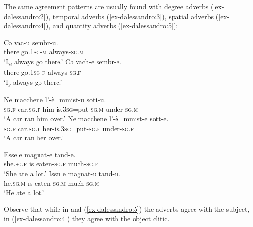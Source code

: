 \documentclass[output=paper
,modfonts
,nonflat]{langsci/langscibook}
\begin{document}
The same agreement patterns are usually found with degree adverbs (\ref{ex-dalessandro:2}), temporal adverbs (\ref{ex-dalessandro:3}), spatial adverbs (\ref{ex-dalessandro:4}), and quantity adverbs (\ref{ex-dalessandro:5}):
\begin{exe}
	\ex \label{ex-dalessandro:2} \citet{Ledgeway2012} 
	\endxlist
\end{exe}
\begin{exe}
	\ex \label{ex-dalessandro:3}
	\xlist
	\ex \label{ex-dalessandro:3a}
	\gll  Cə   vac-u    sembr-u.\\
	there  go.1\textsc{sg-m} always-\textsc{sg.m}\\
	\glt `I\textsc{\textsubscript{m}} always go there.' 
	\ex \label{ex-dalessandro:3b}
	\gll Cə  vach-e    sembr-e.\\
	there  go.1\textsc{sg-f} always-\textsc{sg.f}\\
	\glt `I\textsc{\textsubscript{f}} always go there.' 
	\endxlist
\end{exe}
\begin{exe}
	\ex\label{ex-dalessandro:4} \xlist
	\ex 
	\gll Ne   macchene   l’-è=mmist-u    sott-u.\\
	\textsc{sg.f} car.\textsc{sg.f} him-is.\textsc{3sg=}put-\textsc{sg.m} under-\textsc{sg.m}\\
	\glt `A car ran him over.' 
	\ex
	\gll  Ne   macchene   l’-è=mmist-e    sott-e.\\
	\textsc{sg.f} car.\textsc{sg.f} her-is.\textsc{3sg=}put-\textsc{sg.f} under-\textsc{sg.f}\\
	\glt `A car ran her over.'  
	\endxlist
\end{exe}
\begin{exe}
	\ex \label{ex-dalessandro:5}\citet[45--46]{Lambertelli2003} \xlist
	\ex 
	\gll  Esse   e   magnat-e   tand-e.\\
	she.\textsc{sg.f} is  eaten-\textsc{sg.f} much-\textsc{sg.f}\\
	\glt `She ate a lot.' 
	\ex
	\gll Issu   e  magnat-u   tand-u.\\
	he.\textsc{sg.m} is  eaten-\textsc{sg.m} much-\textsc{sg.m}\\
	\glt `He ate a lot.' 
	\endxlist
\end{exe}
Observe that while in  and (\ref{ex-dalessandro:5}) the adverbs agree with the subject, in (\ref{ex-dalessandro:4}) they agree with the object clitic. 
\end{document}
